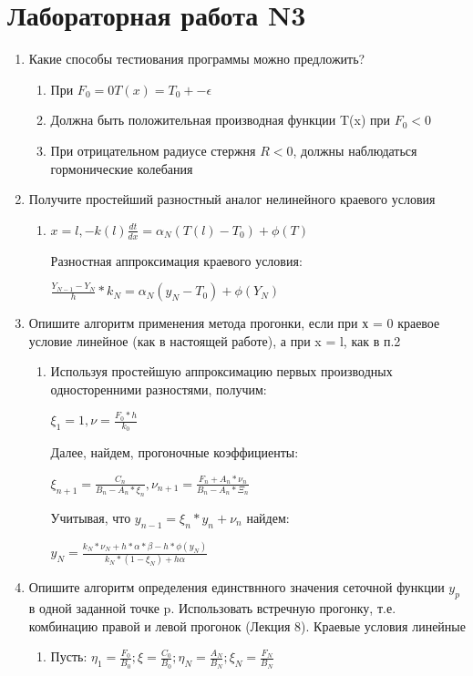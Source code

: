 \documentclass[12pt,a4paper]{scrartcl}
\begin{document}
	\section{Лабораторная работа N3}
	\begin{enumerate}
		\item Какие способы тестиования программы можно предложить?  \begin{enumerate}
			\item При $F_0 = 0 T(x) = T_0 +- \epsilon$
			\item Должна быть положительная производная функции T(x) при $F_0 < 0$
			\item При отрицательном радиусе стержня $R < 0$, должны наблюдаться гормонические колебания
			
		\end{enumerate}
		\item Получите простейший разностный аналог нелинейного краевого условия \begin{enumerate}
			\item $
			x = l, -k(l)\frac{dt}{dx} = \alpha_N(T(l) - T_0) + \phi(T) $

			Разностная аппроксимация краевого условия:
			
			$\frac{Y_{N-1} - Y_N}{h} * k_N = \alpha_N(y_N - T_0) + \phi(Y_N)$
			
		\end{enumerate}
		\item Опишите алгоритм применения метода прогонки, если при х = 0 краевое условие линейное (как в настоящей работе), а при x = l, как в п.2 \begin{enumerate}
			\item Используя простейшую аппроксимацию первых производных односторенними разностями, получим:
			
			$\xi_1 = 1, \nu = \frac{F_0*h}{k_0}$
			
			Далее, найдем, прогоночные коэффициенты:
			
			$\xi_{n+1} = \frac{C_n}{B_n - A_n * \xi_n}, \nu_{n+1} = \frac{F_n + A_n * \nu_n}{B_n - A_n * \Xi_n}$
			
			Учитывая, что $y_{n-1} = \xi_n*y_n + \nu_n$ найдем:
			
			$y_N = \frac{k_N * \nu_N + h*\alpha * \beta - h * \phi(y_N)}{k_N * (1 - \xi_N) + h\alpha}$
			
		\end{enumerate}
		\item Опишите алгоритм определения единствнного значения сеточной функции $y_p$ в одной заданной точке p. Использовать встречную прогонку, т.е. 
		комбинацию правой и левой прогонок (Лекция 8). Краевые условия линейные \begin{enumerate}
			\item Пусть: $\eta_1 = \frac{F_0}{B_0}; \xi = \frac{C_0}{B_0}; \eta_N = \frac{A_N}{B_N}; \xi_N = \frac{F_N}{B_N}$
			

\end{enumerate}
\end{enumerate}
\end{document}
